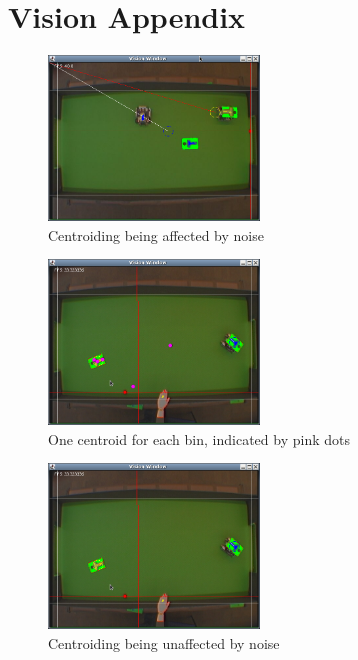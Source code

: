 \section{Vision Appendix}
\label{apx:vision}

\begin{figure}[h!]
  \caption{Centroiding being affected by noise}
  \centering
    \includegraphics[width=0.5\textwidth]{randy_bins_before.png}
\end{figure}

\begin{figure}[h!]
  \caption{One centroid for each bin, indicated by pink dots}
  \centering
    \includegraphics[width=0.5\textwidth]{randy_bins_after_mult.png}
\end{figure}

\begin{figure}[h!]
  \caption{Centroiding being unaffected by noise}
  \centering
    \includegraphics[width=0.5\textwidth]{randy_bins_after.png}
\end{figure}

